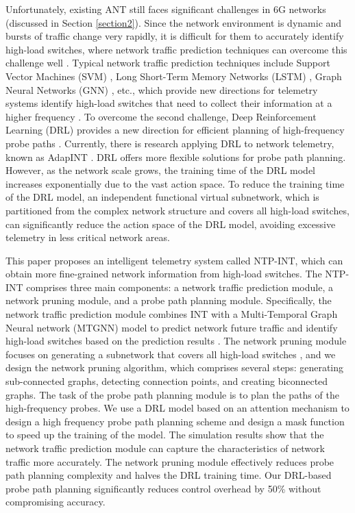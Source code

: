 \documentclass[journal]{IEEEtran}
\begin{document}
Unfortunately, existing ANT still faces significant challenges in 6G networks (discussed in Section \ref{section2}). Since the network environment is dynamic and bursts of traffic change very rapidly, it is difficult for them to accurately identify high-load switches, where network traffic prediction techniques can overcome this challenge well \cite{17}. 
Typical network traffic prediction techniques include Support Vector Machines (SVM) \cite{36}, Long Short-Term Memory Networks (LSTM) \cite{37}, Graph Neural Networks (GNN) \cite{38},  etc., which provide new directions for telemetry systems identify high-load switches that need to collect their information at a higher frequency \cite{18, 19}.
To overcome the second challenge, Deep Reinforcement Learning (DRL) \cite{22} provides a new direction for efficient planning of high-frequency probe paths \cite{NetworkAI}. Currently, there is research applying DRL to network telemetry, known as AdapINT \cite{AdapINT}. DRL offers more flexible solutions for probe path planning. However, as the network scale grows, the training time of the DRL model increases exponentially due to the vast action space.
To reduce the training time of the DRL model, an independent functional virtual subnetwork, which is partitioned from the complex network structure and covers all high-load switches\cite{24, 26}, can significantly reduce the action space of the DRL model, avoiding excessive telemetry in less critical network areas\cite{25}.







This paper proposes an intelligent telemetry system called NTP-INT, which can obtain more fine-grained network information from high-load switches. The NTP-INT comprises three main components: a network traffic prediction module, a network pruning module, and a probe path planning module. 
Specifically, the network traffic prediction module combines INT with a Multi-Temporal Graph Neural network (MTGNN) model to predict network future traffic and identify high-load switches based on the prediction results \cite{27}. 
The network pruning module focuses on generating a subnetwork that covers all high-load switches \cite{28}, and we design the network pruning algorithm, which comprises several steps: generating sub-connected graphs, detecting connection points, and creating biconnected graphs. 
The task of the probe path planning module is to plan the paths of the high-frequency probes. 
We use a DRL model based on an attention mechanism to design a high frequency probe path planning scheme and design a mask function to speed up the training of the model.
The simulation results show that the network traffic prediction module can capture the characteristics of network traffic more accurately. The network pruning module effectively reduces probe path planning complexity and halves the DRL training time. Our DRL-based probe path planning significantly reduces control overhead by 50\% without compromising accuracy.
\end{document}
